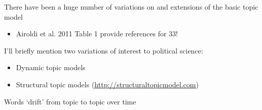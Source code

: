 \documentclass[11pt,compress,professionalfonts]{beamer}
\newcommand{\ita}{\begin{itemize}}
\newcommand{\itm}{\item[]}
\newcommand{\itz}{\end{itemize}}
\begin{document}
%

%
%
%
%
%
%
%
%
%
%
%
%
%
%
%
%
%






There have been a huge number of variations on and extensions of the basic topic model 
\ita
\itm Airoldi et al. 2011 Table 1 provide references for 33!
\itz
I'll briefly mention two variations of interest to political science:
\ita
\itm Dynamic topic models
\itm Structural topic models (\url{http://structuraltopicmodel.com})
\itz


Words `drift' from topic to topic over time
\end{document}

